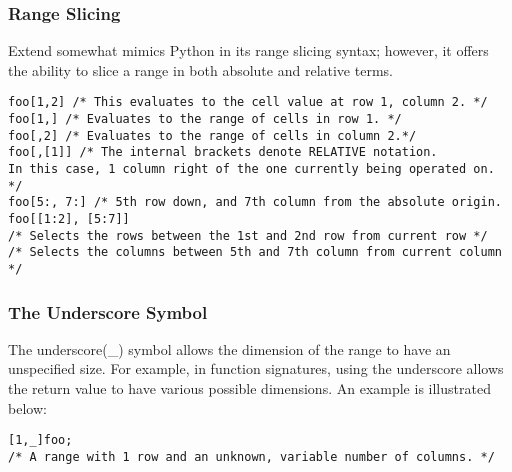 		\subsubsection{Range Slicing}
			Extend somewhat mimics Python in its range slicing syntax; however, it offers the ability to slice a range in both absolute and relative terms.
			\begin{lstlisting}
foo[1,2] /* This evaluates to the cell value at row 1, column 2. */
foo[1,] /* Evaluates to the range of cells in row 1. */
foo[,2] /* Evaluates to the range of cells in column 2.*/
foo[,[1]] /* The internal brackets denote RELATIVE notation. 
In this case, 1 column right of the one currently being operated on. */ 
foo[5:, 7:] /* 5th row down, and 7th column from the absolute origin.
foo[[1:2], [5:7]] 
/* Selects the rows between the 1st and 2nd row from current row */
/* Selects the columns between 5th and 7th column from current column */
			\end{lstlisting}
		\subsubsection{The Underscore Symbol}
			The underscore(\_) symbol allows the dimension of the range to have an unspecified size. For example, in function signatures, using the underscore allows the return value to have various possible dimensions. An example is illustrated below:
			\begin{lstlisting}
[1,_]foo; 
/* A range with 1 row and an unknown, variable number of columns. */
			\end{lstlisting}
